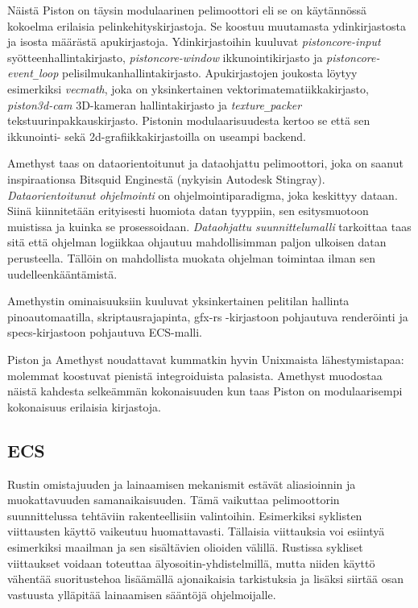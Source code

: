 \documentclass[finnish]{tktltiki2}
\theoremstyle{definition}
\theoremstyle{remark}
\begin{document}
Näistä Piston on täysin modulaarinen pelimoottori eli se on käytännössä kokoelma erilaisia pelinkehityskirjastoja. Se koostuu muutamasta ydinkirjastosta ja isosta määrästä apukirjastoja. Ydinkirjastoihin kuuluvat \textit{pistoncore-input} syötteenhallintakirjasto, \textit{pistoncore-window} ikkunointikirjasto ja \textit{pistoncore-event\texttt{\_}loop} pelisilmukanhallintakirjasto. Apukirjastojen joukosta löytyy esimerkiksi \textit{vecmath}, joka on yksinkertainen vektorimatematiikkakirjasto, \textit{piston3d-cam} 3D-kameran hallintakirjasto ja \textit{texture\texttt{\_}packer} tekstuurinpakkauskirjasto. Pistonin modulaarisuudesta kertoo se että sen ikkunointi- sekä 2d-grafiikkakirjastoilla on useampi backend.

Amethyst\cite{Amethyst} taas on dataorientoitunut ja dataohjattu pelimoottori, joka on saanut inspiraationsa Bitsquid Enginestä (nykyisin Autodesk Stingray)\cite{AmethystReadme}. \textit{Dataorientoitunut ohjelmointi} on ohjelmointiparadigma, joka keskittyy dataan. Siinä kiinnitetään erityisesti huomiota datan tyyppiin, sen esitysmuotoon muistissa ja kuinka se prosessoidaan. \textit{Dataohjattu suunnittelumalli} tarkoittaa taas sitä että ohjelman logiikkaa ohjautuu mahdollisimman paljon ulkoisen datan perusteella. Tällöin on mahdollista muokata ohjelman toimintaa ilman sen uudelleenkääntämistä. \cite{AmethystGlossary}

Amethystin ominaisuuksiin kuuluvat yksinkertainen pelitilan hallinta pinoautomaatilla, skriptausrajapinta, gfx-rs -kirjastoon pohjautuva renderöinti ja specs-kirjastoon pohjautuva ECS-malli.

Piston ja Amethyst noudattavat kummatkin hyvin Unixmaista lähestymistapaa: molemmat koostuvat pienistä integroiduista palasista. Amethyst muodostaa näistä kahdesta selkeämmän kokonaisuuden kun taas Piston on modulaarisempi kokonaisuus erilaisia kirjastoja.

\subsection{ECS}
Rustin omistajuuden ja lainaamisen mekanismit estävät aliasioinnin ja muokattavuuden samanaikaisuuden. Tämä vaikuttaa pelimoottorin suunnittelussa tehtäviin rakenteellisiin valintoihin. Esimerkiksi syklisten viittausten käyttö vaikeutuu huomattavasti. Tällaisia viittauksia voi esiintyä esimerkiksi maailman ja sen sisältävien olioiden välillä. Rustissa sykliset viittaukset voidaan toteuttaa älyosoitin-yhdistelmillä, mutta niiden käyttö vähentää suoritustehoa lisäämällä ajonaikaisia tarkistuksia ja lisäksi siirtää osan vastuusta ylläpitää lainaamisen sääntöjä ohjelmoijalle.
\end{document}
